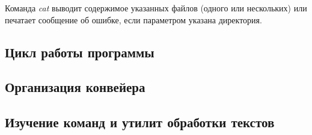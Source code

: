 \documentclass[14pt,a4paper,report]{report}
\begin{document}
Команда \emph{cat} выводит содержимое указанных файлов (одного или нескольких) или печатает сообщение об ошибке, если параметром указана директория.

\clearpage



%
%


\subsection{Цикл работы программы}




\subsection{Организация конвейера}


\subsection{Изучение команд и утилит обработки текстов}
\end{document}
